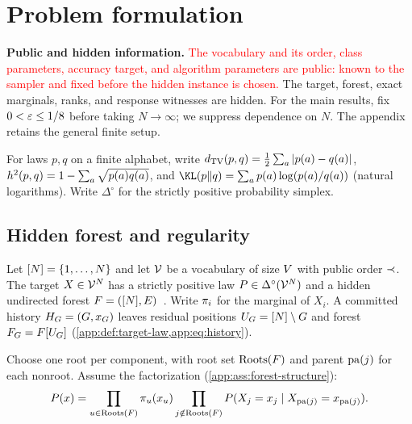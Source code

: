 \section{Problem formulation}
\label{sec:main-setup}

\textbf{Public and hidden information.}
\textcolor{red}{The vocabulary and its order, class parameters, accuracy target,
and algorithm parameters are public: known to the sampler and fixed before
the hidden instance is chosen.}
The target, forest, exact marginals, ranks, and response witnesses are hidden.
For the main results, fix $0<\varepsilon\le1/8$ before taking
$N\to\infty$; we suppress dependence on $N$.
The appendix retains the general finite setup.

For laws $p,q$ on a finite alphabet, write
$d_{\mathrm{TV}}(p,q)=\frac12\sum_a|p(a)-q(a)|$,
$h^2(p,q)=1-\sum_a\sqrt{p(a)q(a)}$, and
$\KLDivergence{p}{q}=\sum_a p(a)\log(p(a)/q(a))$ (natural logarithms).
Write $\Delta^\circ$ for the strictly positive probability simplex.

\subsection{Hidden forest and regularity}
\label{sec:main-target-law}
\label{sec:main-response}

\begin{definition}
\label{main:def:forest-target}
Let $[N]=\{1,\ldots,N\}$ and let $\mathcal V$ be a vocabulary of
size $V$ with public order $\prec$.
The target $X\in\mathcal V^N$ has a strictly positive law
$P\in\Delta^\circ(\mathcal V^N)$ and a hidden undirected forest
$F=([N],E)$\textcolor{red}{~\citep{tan2011markovforest,bhattacharyya2023chowliu}}.
Write $\pi_{i}$ for the marginal of $X_i$.
A committed history $H_{G}=(G,x_G)$ leaves residual positions
$U_{G}=[N]\setminus G$ and forest
$F_{G}=F[U_{G}]$
(\cref{app:def:target-law,app:eq:history}).
\end{definition}

\begin{assumption}
\label{main:ass:forest-structure}
Choose one root per component, with root set $\operatorname{Roots}(F)$ and parent
$\operatorname{pa}(j)$ for each nonroot. Assume the factorization
(\cref{app:ass:forest-structure}):
\begin{equation}
P(x)
 =\prod_{u\in\operatorname{Roots}(F)}\pi_{u}(x_u)
  \prod_{j\notin\operatorname{Roots}(F)}
  P(X_j=x_j\mid X_{\operatorname{pa}(j)}=x_{\operatorname{pa}(j)}).
\label{main:eq:forest-factorization}
\end{equation}
\end{assumption}

